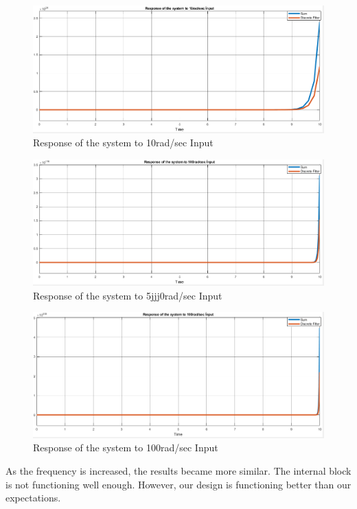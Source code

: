\documentclass[a4paper,12pt]{article}
\begin{document}
\begin{enumerate}
	\begin{figure}[H]
			\center
			\setlength{\unitlength}{\textwidth} 
		\includegraphics[width=1.0\unitlength]{435}
  		\caption{\label{fig:simu2}Response of the system to 10rad/sec Input}
	\end{figure}
	
	\begin{figure}[H]
			\center
			\setlength{\unitlength}{\textwidth} 
  		\includegraphics[width=1.0\unitlength]{455}
  		\caption{\label{fig:simu3}Response of the system to 5jjj0rad/sec Input }
	\end{figure}
		
	\begin{figure}[H]
			\center
			\setlength{\unitlength}{\textwidth} 
		\includegraphics[width=1.0\unitlength]{475}
  		\caption{\label{fig:simu4}Response of the system to 100rad/sec Input}
	\end{figure}
	
	As the frequency is increased, the results became more similar. The internal block is not functioning well enough. However, our design is functioning better than our expectations. 	
	
\end{enumerate}
	
\end{document}
